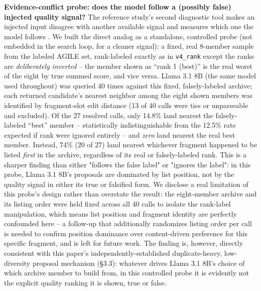 \documentclass{article}
\begin{document}
\textbf{Evidence-conflict probe: does the model follow a (possibly false) injected quality signal?} The reference study's second diagnostic tool makes an injected input disagree with another available signal and measures which one the model follows \citep{fang2026bioreasoninputs}. We built the direct analog as a standalone, controlled probe (not embedded in the search loop, for a cleaner signal): a fixed, real 8-member sample from the labeled AGILE set, rank-labeled exactly as in \texttt{v4\_rank} except the ranks are \emph{deliberately inverted} -- the member shown as ``rank 1 (best)'' is the real worst of the eight by true summed score, and vice versa. Llama 3.1 8B (the same model used throughout) was queried 40 times against this fixed, falsely-labeled archive; each returned candidate's nearest neighbor among the eight shown members was identified by fragment-slot edit distance (13 of 40 calls were ties or unparseable and excluded). Of the 27 resolved calls, only 14.8\% land nearest the falsely-labeled ``best'' member -- statistically indistinguishable from the 12.5\% rate expected if rank were ignored entirely -- and \emph{zero} land nearest the real best member. Instead, 74\% (20 of 27) land nearest whichever fragment happened to be listed \emph{first} in the archive, regardless of its real or falsely-labeled rank. This is a sharper finding than either "follows the false label" or "ignores the label": in this probe, Llama 3.1 8B's proposals are dominated by list position, not by the quality signal in either its true or falsified form. We disclose a real limitation of this probe's design rather than overstate the result: the eight-member archive and its listing order were held fixed across all 40 calls to isolate the rank-label manipulation, which means list position and fragment identity are perfectly confounded here -- a follow-up that additionally randomizes listing order per call is needed to confirm position dominance over content-driven preference for this specific fragment, and is left for future work. The finding is, however, directly consistent with this paper's independently-established duplicate-heavy, low-diversity proposal mechanism (\S3.3): whatever drives Llama 3.1 8B's choice of which archive member to build from, in this controlled probe it is evidently not the explicit quality ranking it is shown, true or false.
\end{document}
